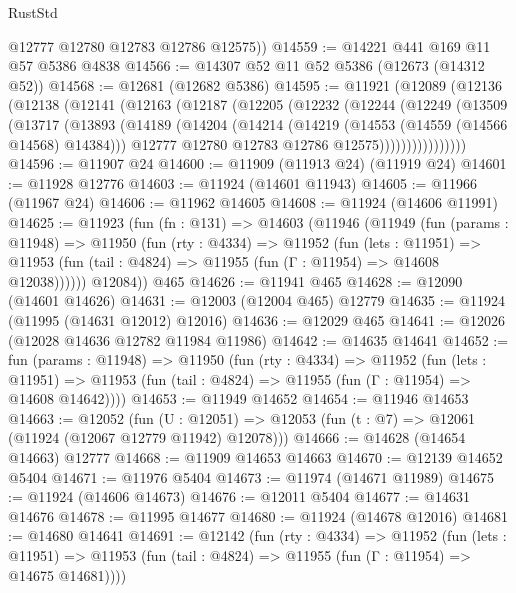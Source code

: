 \begin{lexlean}{RustStd}
\begin{coremodule}
        @12777
        @12780
        @12783
        @12786
        @12575))
@14559 := @14221 @441 @169 @11 @57 @5386 @4838
@14566 := @14307 @52 @11 @52 @5386 (@12673 (@14312 @52))
@14568 := @12681 (@12682 @5386)
@14595 := @11921
    (@12089
      (@12136
        (@12138
          (@12141
            (@12163
              (@12187
                (@12205
                  (@12232
                    (@12244
                      (@12249
                        (@13509
                          (@13717
                            (@13893
                              (@14189
                                (@14204
                                  (@14214
                                    (@14219 (@14553 (@14559 (@14566 @14568) @14384)))
                                    @12777
                                    @12780
                                    @12783
                                    @12786
                                    @12575))))))))))))))))
@14596 := @11907 @24
@14600 := @11909 (@11913 @24) (@11919 @24)
@14601 := @11928 @12776
@14603 := @11924 (@14601 @11943)
@14605 := @11966 (@11967 @24)
@14606 := @11962 @14605
@14608 := @11924 (@14606 @11991)
@14625 := @11923
    (fun (fn : @131) =>
    @14603
      (@11946
        (@11949
          (fun (params : @11948) =>
          @11950
            (fun (rty : @4334) =>
            @11952
              (fun (lets : @11951) =>
              @11953 (fun (tail : @4824) => @11955 (fun (Γ : @11954) => @14608 @12038))))))
        @12084))
    @465
@14626 := @11941 @465
@14628 := @12090 (@14601 @14626)
@14631 := @12003 (@12004 @465) @12779
@14635 := @11924 (@11995 (@14631 @12012) @12016)
@14636 := @12029 @465
@14641 := @12026 (@12028 @14636 @12782 @11984 @11986)
@14642 := @14635 @14641
@14652 := fun (params : @11948) =>
  @11950
    (fun (rty : @4334) =>
    @11952
      (fun (lets : @11951) =>
      @11953 (fun (tail : @4824) => @11955 (fun (Γ : @11954) => @14608 @14642))))
@14653 := @11949 @14652
@14654 := @11946 @14653
@14663 := @12052
    (fun (U : @12051) => @12053 (fun (t : @7) => @12061 (@11924 (@12067 @12779 @11942) @12078)))
@14666 := @14628 (@14654 @14663) @12777
@14668 := @11909 @14653 @14663
@14670 := @12139 @14652 @5404
@14671 := @11976 @5404
@14673 := @11974 (@14671 @11989)
@14675 := @11924 (@14606 @14673)
@14676 := @12011 @5404
@14677 := @14631 @14676
@14678 := @11995 @14677
@14680 := @11924 (@14678 @12016)
@14681 := @14680 @14641
@14691 := @12142
    (fun (rty : @4334) =>
    @11952
      (fun (lets : @11951) =>
      @11953 (fun (tail : @4824) => @11955 (fun (Γ : @11954) => @14675 @14681))))

\end{coremodule}
\end{lexlean}
